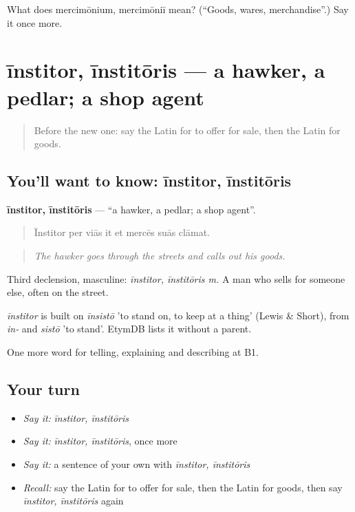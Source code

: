 \begin{tcolorbox}[breakable,colback=teal!4,colframe=teal!35!black,title={Before you move on}]
What does mercimōnium, mercimōniī mean? (\textquotedblleft{}Goods, wares, merchandise\textquotedblright{}.) Say it once more.
\end{tcolorbox}
\section[īnstitor, īnstitōris]{īnstitor, īnstitōris — a hawker, a pedlar; a shop agent}

\label{lesson:LA-C462-institor}



\begin{quote}
Before the new one: say the Latin for to offer for sale, then the Latin for goods.
\end{quote}

\subsection*{You'll want to know: īnstitor, īnstitōris}
\textbf{īnstitor, īnstitōris} — \textquotedblleft{}a hawker, a pedlar; a shop agent\textquotedblright{}.

\begin{quote}
Īnstitor per viās it et mercēs suās clāmat.
\end{quote}

\begin{quote}
\emph{The hawker goes through the streets and calls out his goods.}
\end{quote}

Third declension, masculine: \emph{īnstitor, īnstitōris m.} A man who sells for someone else, often on the street.

\begin{cousinweb}
\emph{īnstitor} is built on \emph{īnsistō} 'to stand on, to keep at a thing' (Lewis \& Short), from \emph{in-} and \emph{sistō} 'to stand'. EtymDB lists it without a parent.
\end{cousinweb}

\begin{grammarlens}[title={What you've built}]
One more word for telling, explaining and describing at B1.
\end{grammarlens}

\subsection*{Your turn}
\begin{itemize}
\raggedright
  \item \emph{Say it:} \emph{īnstitor, īnstitōris}
  \item \emph{Say it:} \emph{īnstitor, īnstitōris}, once more
  \item \emph{Say it:} a sentence of your own with \emph{īnstitor, īnstitōris}
  \item \emph{Recall:} say the Latin for to offer for sale, then the Latin for goods, then say \emph{īnstitor, īnstitōris} again
\end{itemize}

